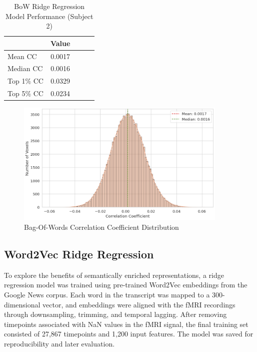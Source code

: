 \documentclass[11pt,letterpaper]{article}
\begin{document}
\begin{table}[H]
\centering
\begin{tabular}{lcccc}
\toprule
\textbf{} & \textbf{Value} \\
\midrule
Mean CC    & 0.0017 \\
Median CC  & 0.0016 \\
Top 1\% CC & 0.0329 \\
Top 5\% CC & 0.0234 \\
\bottomrule
\end{tabular}
\caption{BoW Ridge Regression Model Performance (Subject 2)}
\label{tab:bow_cc_results}
\end{table}

\begin{figure}[ht]
    \centering
    \includegraphics[width=0.9\textwidth]{figs/cc-dist-bow.png}
    \caption{Bag-Of-Words Correlation Coefficient Distribution}
    \label{fig:prob_hist_bow}
\end{figure}

\vspace{1em} %
\subsection{Word2Vec Ridge Regression}
\vspace{0.5em} %

To explore the benefits of semantically enriched representations, a ridge regression model was trained using pre-trained Word2Vec embeddings from the Google News corpus. Each word in the transcript was mapped to a 300-dimensional vector, and embeddings were aligned with the fMRI recordings through downsampling, trimming, and temporal lagging. After removing timepoints associated with NaN values in the fMRI signal, the final training set consisted of 27,867 timepoints and 1,200 input features. The model was saved for reproducibility and later evaluation.
\end{document}
